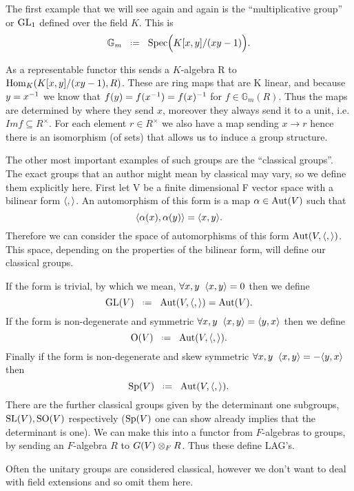 \begin{example}[\(\mathbb{G}_m\)]
    The first example that we will see again and again is the ``multiplicative group'' or \(\operatorname{GL}_1\) defined over the field \(K\). This is 
    \[\mathbb{G}_m \defeq \Spec\Bigl( K[x,y]/(xy - 1)\Bigr).\]

    As a representable functor this sends a \(K\)-algebra R to \(\operatorname{Hom}_K(K[x,y]/(xy - 1), R)\). These are ring maps that are K linear, and  because \(y = x^{-1}\) we know that \(f(y) = f(x^{-1}) = f(x)^{-1}\) for \(f\in \mathbb{G}_m(R)\). Thus the maps are determined by where they send \(x\), moreover they always send it to a unit, i.e. \(Im f \subseteq R^\times\). For each element \(r\in R^\times\) we also have a map sending \(x\to r\) hence there is an isomorphism (of sets) that allows us to induce a group structure. 
\end{example}

The other most important examples of such groups are the ``classical groups''. The exact groups that an author might mean by classical may vary, so we define them explicitly here. First let V be a finite dimensional F vector space with a bilinear form \(\langle ,\rangle\). An automorphism of this form is a map \(\alpha\in \operatorname{Aut}(V)\) such that 
\[\langle \alpha(x), \alpha(y)\rangle = \langle x,y\rangle.\]
Therefore we can consider the space of automorphisms of this form \(\operatorname{Aut}(V, \langle ,\rangle)\). This space, depending on the properties of the bilinear form, will define our classical groups. 

If the form is trivial, by which we mean, \(\forall x,y \;\; \langle x, y\rangle = 0\) then we define 
\[\GL(V) \defeq \Aut(V, \inner{,}) = \Aut(V).\]
If the form is non-degenerate and symmetric \(\forall x,y \;\; \langle x, y\rangle = \langle y,x\rangle\) then we define
\[\mathrm{O}(V) \defeq \Aut(V, \inner{,}).\]
Finally if the form is non-degenerate and skew symmetric \(\forall x,y \;\; \langle x, y\rangle = -\langle y,x\rangle\) then 
\[\Sp(V) \defeq \Aut(V, \inner{,}).\]
There are the further classical groups given by the determinant one subgroups, \(\operatorname{SL}(V), \mathrm{SO}(V)\) respectively (\(\operatorname{Sp}(V)\) one can show already implies that the determinant is one). We can make this into a functor from \(F\)-algebras to groups, by sending an \(F\)-algebra \(R\) to \(G(V)\otimes_F R\). Thus these define LAG's. 

\begin{remark}
    Often the unitary groups are considered classical, however we don't want to deal with field extensions and so omit them here. 
\end{remark}

